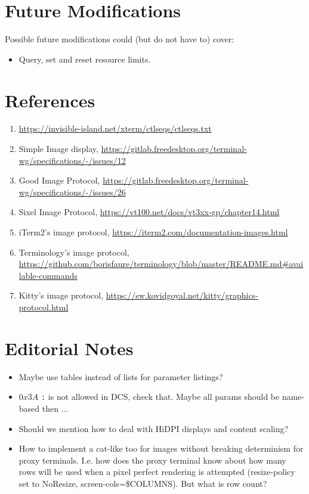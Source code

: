 \documentclass[a4paper]{article}
\newcommand{\code}[1]{\colorbox{light-gray}{\texttt{#1}}}
\begin{document}
\section{Future Modifications} %

Possible future modifications could (but do not have to) cover:

\begin{itemize}
    \item Query, set and reset resource limits.
\end{itemize}
\section{References} %

\begin{enumerate}
    \item \label{ref:ctlseqs}\url{https://invisible-island.net/xterm/ctlseqs/ctlseqs.txt}
    \item \label{ref:twg-simple-image-display}Simple Image display, \url{https://gitlab.freedesktop.org/terminal-wg/specifications/-/issues/12}
    \item \label{ref:twg-gip}Good Image Protocol, \url{https://gitlab.freedesktop.org/terminal-wg/specifications/-/issues/26}
    \item \label{ref:image-sixel}Sixel Image Protocol, \url{https://vt100.net/docs/vt3xx-gp/chapter14.html}
    \item \label{ref:image-item2}iTerm2's image protocol, \url{https://iterm2.com/documentation-images.html}
    \item \label{ref:image-terminology}Terminology's image protocol, \url{https://github.com/borisfaure/terminology/blob/master/README.md#available-commands}
    \item \label{ref:image-kitty}Kitty's image protocol, \url{https://sw.kovidgoyal.net/kitty/graphics-protocol.html}
\end{enumerate}
\section{Editorial Notes} %

\begin{itemize}
    \item Maybe use tables instead of lists for parameter listings?
    \item $0x3A$ \code{:} is not allowed in DCS, check that. Maybe all params should be name-based then ...
    \item Should we mention how to deal with HiDPI displays and content scaling?
    \item How to implement a cat-like too for images without breaking determinism for proxy
        terminals. I.e. how does the proxy terminal know about how many rows will be used when
        a pixel perfect rendering is attempted (resize-policy set to NoResize,
        screen-cols=\$COLUMNS). But what is row count?
\end{itemize}

\listoftodos
\end{document}
